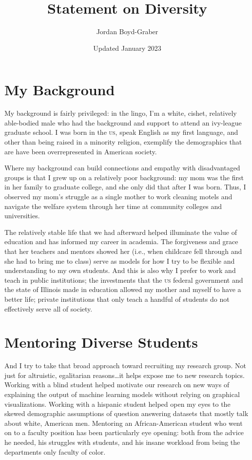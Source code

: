 \documentclass[11pt]{amsart}
\newcommand{\abr}[1]{\textsc{#1}}
\begin{document}
 \title{Statement on Diversity}

 \author{Jordan Boyd-Graber}
\address{University of Maryland}

\date{Updated January 2023}


\keywords{}

\maketitle

\section{My Background}

My background is fairly privileged: in the lingo, I'm a white, cishet,
relatively able-bodied male who had the background and support to attend an ivy-league graduate school.
%
I was born in the \abr{us}, speak English as my first language, and
other than being raised in a minority religion, exemplify the
demographics that are have been overrepresented in American society.

Where my background can build connections and empathy with
disadvantaged groups is that I grew up on a relatively poor
background: my mom was the first in her family to graduate college,
and she only did that after I was born.
%
Thus, I observed my mom's struggle as a single mother to work cleaning
motels and navigate the welfare system through her time at community colleges and universities.

The relatively stable life that we had afterward helped illuminate the
value of education and has informed my career in academia.
%
The forgiveness and grace that her teachers and mentors showed her
(i.e., when childcare fell through and she had to bring me to class)
serve as models for how I try to be flexible and understanding to my
own students.
%
And this is also why I prefer to work and teach in public
institutions; the investments that the \abr{us} federal government and
the state of Illinois made in education allowed my mother and myself
to have a better life; private institutions that only teach a handful
of students do not effectively serve all of society.

\section{Mentoring Diverse Students}

And I try to take that broad approach toward recruiting my research
group.
%
Not just for altruistic, egalitarian reasons\dots it helps expose me
to new research topics.
%
Working with a blind student helped motivate our research on new ways
of explaining the output of machine learning models without relying on
graphical visualizations.
%
Working with a hispanic student helped open my eyes to the skewed
demographic assumptions of question answering datasets that mostly
talk about white, American men.
%
Mentoring an African-American student who went on to a faculty
position has been particularly eye opening: both from the advice he needed, his struggles with students, and his insane workload from
being the departments only faculty of color.
\end{document}
